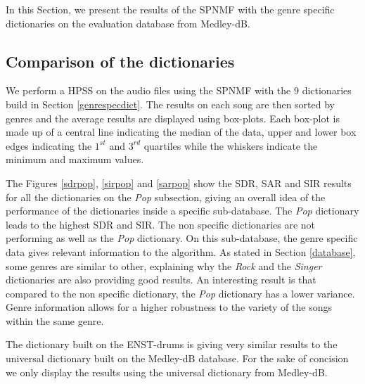 \documentclass{article}
\begin{document}
In this Section, we present the results of the SPNMF with the genre specific dictionaries on the evaluation database from Medley-dB.

\subsection{Comparison of the dictionaries}

We perform a HPSS on the audio files using the SPNMF with the $9$ dictionaries build in Section \ref{genrespecdict}. The results on each song are then sorted by genres and the average results are displayed using box-plots. Each box-plot is made up of a central line indicating the median of the data, upper and lower box edges indicating the $1^{st}$ and $3^{rd}$ quartiles while the whiskers indicate the minimum and maximum values. 


The Figures \ref{sdrpop}, \ref{sirpop} and \ref{sarpop} show the SDR, SAR and SIR results for all the dictionaries on the \emph{Pop} subsection, giving an overall idea of the performance of the dictionaries inside a specific sub-database. The \emph{Pop} dictionary leads to the highest SDR and SIR. The non specific dictionaries are not performing as well as the \emph{Pop} dictionary. On this sub-database, the genre specific data gives relevant information to the algorithm. As stated in Section \ref{database}, some genres are similar to other, explaining why the \emph{Rock} and the \emph{Singer} dictionaries are also providing good results. 
An interesting result is that compared to the non specific dictionary, the \emph{Pop} dictionary has a lower variance. Genre information allows for a higher robustness to the variety of the songs within the same genre.  

The dictionary built on the ENST-drums is giving very similar results to the universal dictionary built on the Medley-dB database. For the sake of concision we only display the results using the universal dictionary from Medley-dB. 
\end{document}
